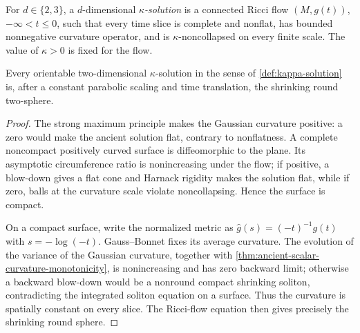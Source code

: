 \begin{definition}
\label{def:kappa-solution}
\notready
For $d\in\{2,3\}$, a $d$-dimensional \emph{$\kappa$-solution} is a connected Ricci flow
$(M,g(t))$, $-\infty<t\le0$, such that every time slice is complete and
nonflat, has bounded nonnegative curvature operator, and is
$\kappa$-noncollapsed on every finite scale.  The value of $\kappa>0$ is
fixed for the flow.
\end{definition}

\begin{theorem}
\label{thm:two-dimensional-kappa-solutions-round}
\notready
Every orientable two-dimensional $\kappa$-solution in the sense of
\ref{def:kappa-solution} is, after a constant
parabolic scaling and time translation, the shrinking round two-sphere.
\end{theorem}

\begin{proof}
The strong maximum principle makes the Gaussian curvature positive: a zero
would make the ancient solution flat, contrary to nonflatness.  A complete
noncompact positively curved surface is diffeomorphic to the plane.  Its
asymptotic circumference ratio is nonincreasing under the flow; if positive,
a blow-down gives a flat cone and Harnack rigidity makes the solution flat,
while if zero, balls at the curvature scale violate noncollapsing.  Hence the
surface is compact.

On a compact surface, write the normalized metric as
$\widehat g(s)=(-t)^{-1}g(t)$ with $s=-\log(-t)$.  Gauss--Bonnet fixes its
average curvature.  The evolution of the variance of the Gaussian curvature,
together with \ref{thm:ancient-scalar-curvature-monotonicity}, is
nonincreasing and has zero backward limit; otherwise a backward blow-down
would be a nonround compact shrinking soliton, contradicting the integrated
soliton equation on a surface.  Thus the curvature is spatially constant on
every slice.  The Ricci-flow equation then gives precisely the shrinking
round sphere.
\end{proof}

